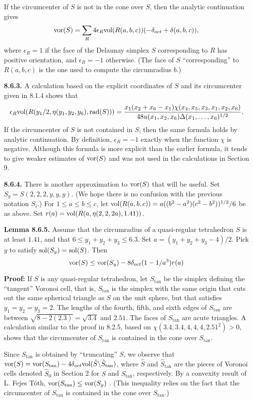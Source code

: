 \bigskip
If the circumcenter of $S$ is not in the cone over $S$,
then the analytic continuation gives
$$\operatorname{vor}(S) = \sum_R 4\epsilon_R\hbox{vol}(R(a,b,c))(-\delta_{oct}+\delta(a,b,c)),$$
where $\epsilon_R=1$ if the face of the 
Delaunay simplex $S$ corresponding
to $R$ has positive orientation, and $\epsilon_R=-1$ otherwise.
(The face of $S$ ``corresponding'' to $R(a,b,c)$ is the one
used to compute the circumradius $b$.)

\bigskip
{\bf 8.6.3.}
A calculation based on the explicit coordinates
of $S$ and its circumcenter given in 8.1.4 shows that
$$\epsilon_R \hbox{vol}(R(y_1/2,\eta(y_1,y_2,y_6),\operatorname{rad}(S)))=
{ x_1(x_2+x_6-x_1)
	\chi(x_4,x_5,x_3,x_1,x_2,x_6)\over
	48 u(x_1,x_2,x_6)\Delta(x_1,\ldots,x_6)^{1/2}}.$$
If the circumcenter of $S$ is not contained in $S$, then
the same formula holds
by analytic continuation.  
By definition, $\epsilon_R = -1$
exactly when the function $\chi$ is negative.
Although this formula
is more explicit than the earlier formula, it tends
to give weaker estimates of $\operatorname{vor}(S)$ and was not used
in the calculations in Section 9.  


\bigskip
{\bf 8.6.4.}
There is another approximation to $\operatorname{vor}(S)$ that
will be useful.
Set $S_y = S(2,2,2,y,y,y)$. (We hope there is no confusion
with the previous notation $S_i$.)
For $1\le a\le b\le c$, let $\hbox{vol}(R(a,b,c)) =
 a((b^2-a^2)(c^2-b^2))^{1/2}/6$ be as above.
Set $r(a) = \hbox{vol}(R(a,\eta(2,2,2a),1.41))$. 

{\bf Lemma 8.6.5.}  Assume that the circumradius of a quasi-regular
tetrahedron $S$
is at least $1.41$, and that $6\le y_1+y_2+y_3\le 6.3$.  Set
$a= (y_1+y_2+y_3-4)/2$.  Pick $y$ to satisfy $\operatorname{sol}(S_y)=
\operatorname{sol}(S)$.  Then
$$
\operatorname{vor}(S) \le \operatorname{vor}(S_y)-8\delta_{oct}(1-1/a^3)r(a)
$$

{\bf Proof:}
If $S$ is any quasi-regular tetrahedron, let $S_{\tan}$ be the simplex
defining the ``tangent'' Voronoi cell, that is,
$S_{\tan}$ is the simplex with the same origin
that cuts out the same spherical
triangle as $S$ on the unit sphere, but that satisfies
$y_1=y_2=y_3=2$.  
The lengths of the fourth, fifth, and sixth edges of $S_{\tan}$
are between $\sqrt{8-2(2.3)}=\sqrt{3.4}$ and $2.51$.  The
faces of $S_{\tan}$ are acute triangles.  A calculation
similar to the proof in 8.2.5, 
based on $\chi(3.4,3.4,4,4,4,2.51^2)>0$,
shows that the circumcenter of $S_{\tan}$ is contained in
the cone over $S_{\tan}$.

Since $S_{\tan}$ is obtained by ``truncating'' $S$, we observe that
$\operatorname{vor}(S)=\operatorname{vor}(S_{\tan})-4\delta_{oct}\hbox{vol}(\hat S\backslash 
\hat S_{{\tan}})$,
where $\hat S$ and $\hat S_{{\tan}}$
are the pieces of Voronoi cells denoted $\hat S_0$ in Section
2 for $S$ and $S_{\tan}$, respectively.  
By a convexity result of
L. Fejes T\'oth, $\operatorname{vor}(S_{\tan})\le \operatorname{vor}(S_y)$
\cite{FT,p.125}.
(This inequality relies on the fact that
the circumcenter of $S_{\tan}$ 
is contained in the cone over $S_{\tan}$.)

